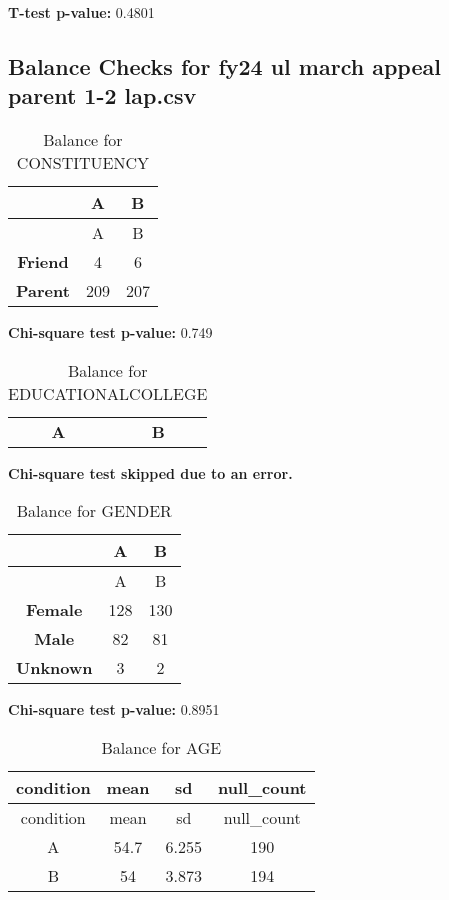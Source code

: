 \documentclass[
]{article}
\begin{document}
\textbf{T-test p-value:} 0.4801\\
\pagebreak \clearpage

\subsection{Balance Checks for fy24 ul march appeal parent 1-2
lap.csv}\label{balance-checks-for-fy24-ul-march-appeal-parent-1-2-lap.csv}

\begin{longtable}[]{@{}ccc@{}}
\caption{Balance for CONSTITUENCY}\tabularnewline
\toprule\noalign{}
~ & A & B \\
\midrule\noalign{}
\endfirsthead
\toprule\noalign{}
~ & A & B \\
\midrule\noalign{}
\endhead
\bottomrule\noalign{}
\endlastfoot
\textbf{Friend} & 4 & 6 \\
\textbf{Parent} & 209 & 207 \\
\end{longtable}

\textbf{Chi-square test p-value:} 0.749\\
\pagebreak

\begin{longtable}[]{@{}cc@{}}
\caption{Balance for EDUCATIONALCOLLEGE}\tabularnewline
\toprule\noalign{}
\endfirsthead
\endhead
\bottomrule\noalign{}
\endlastfoot
\textbf{A} & \textbf{B} \\
\end{longtable}

\textbf{Chi-square test skipped due to an error.} \pagebreak

\begin{longtable}[]{@{}ccc@{}}
\caption{Balance for GENDER}\tabularnewline
\toprule\noalign{}
~ & A & B \\
\midrule\noalign{}
\endfirsthead
\toprule\noalign{}
~ & A & B \\
\midrule\noalign{}
\endhead
\bottomrule\noalign{}
\endlastfoot
\textbf{Female} & 128 & 130 \\
\textbf{Male} & 82 & 81 \\
\textbf{Unknown} & 3 & 2 \\
\end{longtable}

\textbf{Chi-square test p-value:} 0.8951\\
\pagebreak

\begin{longtable}[]{@{}cccc@{}}
\caption{Balance for AGE}\tabularnewline
\toprule\noalign{}
condition & mean & sd & null\_count \\
\midrule\noalign{}
\endfirsthead
\toprule\noalign{}
condition & mean & sd & null\_count \\
\midrule\noalign{}
\endhead
\bottomrule\noalign{}
\endlastfoot
A & 54.7 & 6.255 & 190 \\
B & 54 & 3.873 & 194 \\
\end{longtable}
\end{document}
